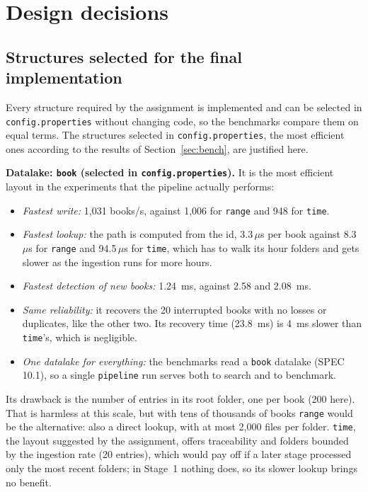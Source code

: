 \documentclass[11pt,a4paper]{article}
\newcommand{\code}[1]{\texttt{#1}}
\newcommand{\us}{\,$\mu$s}
\begin{document}
\section{Design decisions}\label{sec:decisions}

\subsection{Structures selected for the final implementation}
Every structure required by the assignment is implemented and can be selected in
\code{config.properties} without changing code, so the benchmarks compare them on equal terms. The
structures selected in \code{config.properties}, the most efficient ones according to the results of
Section~\ref{sec:bench}, are justified here.

\textbf{Datalake: \code{book} (selected in \code{config.properties}).} It is the most efficient
layout in the experiments that the pipeline actually performs:
\begin{itemize}
  \item \emph{Fastest write:} 1,031 books/s, against 1,006 for \code{range} and 948 for \code{time}.
  \item \emph{Fastest lookup:} the path is computed from the id, 3.3\us{} per book against 8.3\us{}
        for \code{range} and 94.5\us{} for \code{time}, which has to walk its hour folders and gets
        slower as the ingestion runs for more hours.
  \item \emph{Fastest detection of new books:} 1.24~ms, against 2.58 and 2.08~ms.
  \item \emph{Same reliability:} it recovers the 20 interrupted books with no losses or duplicates,
        like the other two. Its recovery time (23.8~ms) is 4~ms slower than \code{time}'s, which is
        negligible.
  \item \emph{One datalake for everything:} the benchmarks read a \code{book} datalake (SPEC 10.1),
        so a single \code{pipeline} run serves both to search and to benchmark.
\end{itemize}
Its drawback is the number of entries in its root folder, one per book (200 here). That is harmless
at this scale, but with tens of thousands of books \code{range} would be the alternative: also a
direct lookup, with at most 2,000 files per folder. \code{time}, the layout suggested by the
assignment, offers traceability and folders bounded by the ingestion rate (20 entries), which would
pay off if a later stage processed only the most recent folders; in Stage~1 nothing does, so its
slower lookup brings no benefit.
\end{document}
